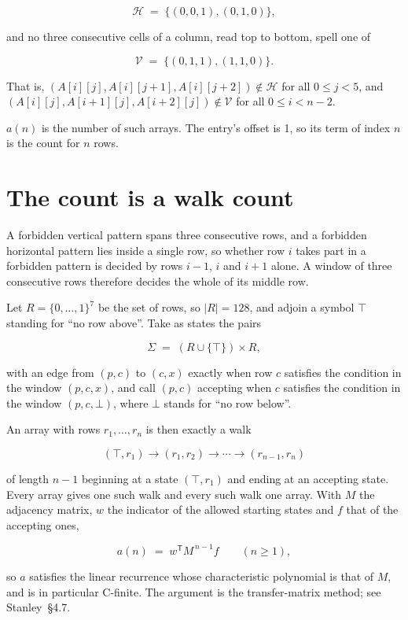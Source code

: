 \documentclass[11pt]{article}
\theoremstyle{definition}
\begin{document}
\[\mathcal{H} \;=\; \{(0,0,1), (0,1,0)\},\]

and no three consecutive cells of a column, read top to bottom, spell one of

\[\mathcal{V} \;=\; \{(0,1,1), (1,1,0)\}.\]

That is, $(A[i][j],A[i][j{+}1],A[i][j{+}2]) \notin \mathcal{H}$ for all $0 \le j < 5$, and $(A[i][j],A[i{+}1][j],A[i{+}2][j]) \notin \mathcal{V}$ for all $0 \le i < n-2$.

$a(n)$ is the number of such arrays. The entry's offset is 1, so its term of index $n$ is the count for $n$ rows.

\section{The count is a walk count}

A forbidden vertical pattern spans three consecutive rows, and a forbidden horizontal pattern lies inside a single row, so whether row $i$ takes part in a forbidden pattern is decided by rows $i-1$, $i$ and $i+1$ alone. A window of three consecutive rows therefore decides the whole of its middle row.

Let $R = \{0,\dots,1\}^{7}$ be the set of rows, so $|R| = 128$, and adjoin a symbol $\top$ standing for ``no row above''. Take as states the pairs

\[\Sigma \;=\; (R \cup \{\top\}) \times R,\]

with an edge from $(p,c)$ to $(c,x)$ exactly when row $c$ satisfies the condition in the window $(p,c,x)$, and call $(p,c)$ accepting when $c$ satisfies the condition in the window $(p,c,\bot)$, where $\bot$ stands for ``no row below''.

An array with rows $r_1,\dots,r_n$ is then exactly a walk

\[(\top,r_1) \to (r_1,r_2) \to \cdots \to (r_{n-1},r_n)\]

of length $n-1$ beginning at a state $(\top,r_1)$ and ending at an accepting state. Every array gives one such walk and every such walk one array. With $M$ the adjacency matrix, $w$ the indicator of the allowed starting states and $f$ that of the accepting ones,

\[a(n) \;=\; w^{\mathsf T} M^{\,n-1} f \qquad (n \ge 1),\]

so $a$ satisfies the linear recurrence whose characteristic polynomial is that of $M$, and is in particular C-finite. The argument is the transfer-matrix method; see Stanley~\S4.7.
\end{document}
